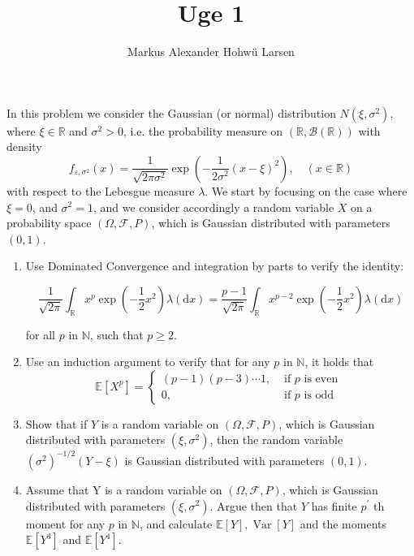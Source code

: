 \documentclass{Class}
\title{Uge 1}
\author{Markus Alexander Hohwü Larsen}
\newcommand{\N}{\mathbb{N}}
\newcommand{\1}{\mathbbm{1}}
\begin{document}
In this problem we consider the Gaussian (or normal) distribution $N\left(\xi, \sigma^2\right)$, where $\xi \in \mathbb{R}$ and $\sigma^2>0$, i.e. the probability measure on $(\mathbb{R}, \mathcal{B}(\mathbb{R}))$ with density
    $$
    f_{\varepsilon, \sigma^2}(x)=\frac{1}{\sqrt{2 \pi \sigma^2}} \exp \left(-\frac{1}{2 \sigma^2}(x-\xi)^2\right), \quad(x \in \mathbb{R})
    $$
    with respect to the Lebesgue measure $\lambda$. We start by focusing on the case where $\xi=0$, and $\sigma^2=1$, and we consider accordingly a random variable $X$ on a probability space $(\Omega, \mathcal{F}, P)$, which is Gaussian distributed with parameters $(0,1)$.
\begin{enumerate}
    \item Use Dominated Convergence and integration by parts to verify the identity:

    $$
    \frac{1}{\sqrt{2 \pi}} \int_{\mathbb{R}} x^p \exp \left(-\frac{1}{2} x^2\right) \lambda(\mathrm{d} x)=\frac{p-1}{\sqrt{2 \pi}} \int_{\mathbb{R}} x^{p-2} \exp \left(-\frac{1}{2} x^2\right) \lambda(\mathrm{d} x)
    $$
    
    for all $p$ in $\N$, such that $p \geq 2$.

    \item Use an induction argument to verify that for any $p$ in $\mathbb{N}$, it holds that
        $$\mathbb{E}\left[X^p\right]= \begin{cases}(p-1)(p-3) \cdots 1, & \text { if } p \text { is even } \\ 0, & \text { if } p \text { is odd }\end{cases}$$
    \item Show that if $Y$ is a random variable on $(\Omega, \mathcal{F}, P)$, which is Gaussian distributed with parameters $\left(\xi, \sigma^2\right)$, then the random variable $\left(\sigma^2\right)^{-1 / 2}(Y-\xi)$ is Gaussian distributed with parameters $(0,1)$.
    \item Assume that Y is a random variable on $(\Omega, \mathcal{F}, P)$, which is Gaussian distributed with parameters $\left(\xi, \sigma^2\right)$. Argue then that $Y$ has finite $p^{\prime}$ th moment for any $p$ in $\mathbb{N}$, and calculate $\mathbb{E}[Y], \operatorname{Var}[Y]$ and the moments $\mathbb{E}\left[Y^3\right]$ and $\mathbb{E}\left[Y^4\right]$.
\end{enumerate}
\solution
\end{document}
